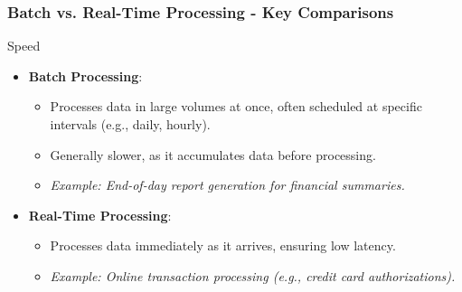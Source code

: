 \documentclass[aspectratio=169]{beamer}
\begin{document}
\begin{frame}[fragile]
    \frametitle{Batch vs. Real-Time Processing - Key Comparisons}
    \begin{block}{Speed}
        \begin{itemize}
            \item \textbf{Batch Processing}:
                \begin{itemize}
                    \item Processes data in large volumes at once, often scheduled at specific intervals (e.g., daily, hourly).
                    \item Generally slower, as it accumulates data before processing.
                    \item \textit{Example: End-of-day report generation for financial summaries.}
                \end{itemize}
            \item \textbf{Real-Time Processing}:
                \begin{itemize}
                    \item Processes data immediately as it arrives, ensuring low latency.
                    \item \textit{Example: Online transaction processing (e.g., credit card authorizations).}
                \end{itemize}
        \end{itemize}
    \end{block}
\end{frame}
\end{document}
